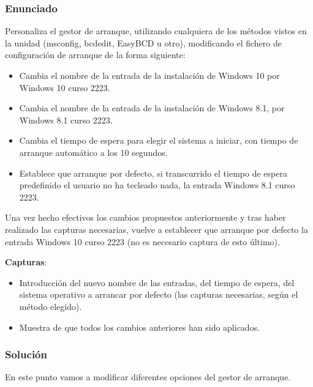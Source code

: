 \subsubsection{Enunciado}
Personaliza el gestor de arranque, utilizando cualquiera de los métodos vistos en la unidad (msconfig, bcdedit, EasyBCD u otro), modificando el fichero de configuración de arranque de la forma siguiente:

\begin{itemize}
    \item Cambia el nombre de la entrada de la instalación de Windows 10 por Windows 10 curso 2223.
    \item Cambia el nombre de la entrada de la instalación de Windows 8.1, por Windows 8.1 curso 2223.
    \item Cambia el tiempo de espera para elegir el sistema a iniciar, con tiempo de arranque automático a los 10 segundos.
    \item Establece que arranque por defecto, si transcurrido el tiempo de espera predefinido el usuario no ha tecleado nada, la entrada Windows 8.1 curso 2223.
\end{itemize}

Una vez hecho efectivos los cambios propuestos anteriormente y tras haber realizado las capturas necesarias, vuelve a establecer que arranque por defecto la entrada Windows 10 curso 2223 (no es necesario captura de esto último).

\textbf{Capturas}:

\begin{itemize}
    \item Introducción del nuevo nombre de las entradas, del tiempo de espera, del sistema operativo a arrancar por defecto (las capturas necesarias, según el método elegido).
    \item Muestra de que todos los cambios anteriores han sido aplicados.
\end{itemize}

\subsubsection{Solución}

En este punto vamos a modificar diferentes opciones del gestor de arranque.

